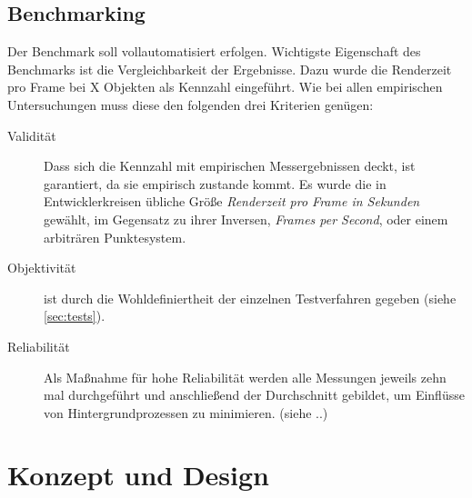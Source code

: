 \section{Benchmarking}
Der Benchmark soll vollautomatisiert erfolgen. Wichtigste Eigenschaft des Benchmarks ist die Vergleichbarkeit der Ergebnisse. Dazu wurde die Renderzeit pro Frame bei X Objekten als Kennzahl eingeführt. Wie bei allen empirischen Untersuchungen muss diese den folgenden drei Kriterien genügen:\\
\begin{description} 
\item[Validität] Dass sich die Kennzahl mit empirischen Messergebnissen deckt, ist garantiert, da sie empirisch zustande kommt. Es wurde die in Entwicklerkreisen übliche Größe {\em Renderzeit pro Frame in Sekunden} gewählt, im Gegensatz zu ihrer Inversen, {\em Frames per Second}, oder einem arbiträren Punktesystem.\\
\item[Objektivität] ist durch die Wohldefiniertheit der einzelnen Testverfahren gegeben (siehe \ref{sec:tests}).\\
\item[Reliabilität] Als Maßnahme für hohe Reliabilität werden alle Messungen jeweils zehn mal durchgeführt und anschließend der Durchschnitt gebildet, um Einflüsse von Hintergrundprozessen zu minimieren. (siehe ..) \\
\end{description}

\chapter{Konzept und Design}

